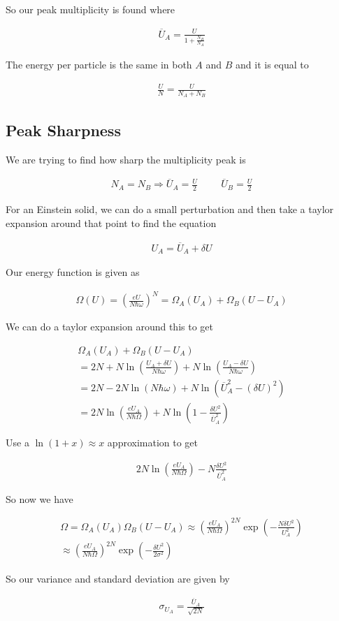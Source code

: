 \documentclass[fleqn]{report}
\newcommand{\hp}{\hspace{1cm}}
\newcommand{\equations} [1] {
\begin{gather*}
#1
\end{gather*}
}
\begin{document}
So our peak multiplicity is found where 

\equations{
    \overline U_A 
    =
    \frac{U}{1 + \frac{N_B}{N_A}}
}

The energy per particle is the same in both $A$ and $B$ and it is equal 
to 
\equations{
    \frac{U}{N}
    =
    \frac{U}{N_A + N_B}
}

\subsection{Peak Sharpness}
We are trying to find how sharp the multiplicity peak is 

\equations{
    N_A 
    =
    N_B 
    \Rightarrow 
    \overline U_A
    =
    \frac{U}{2}
    \hp
    \overline U_B
    =
    \frac{U}{2}
}

For an Einstein solid, we can do a small perturbation and then take a taylor 
expansion around that point to find the equation 

\equations{
    U_A 
    =
    \overline U_A
    +
    \delta U
}

Our energy function is given as 
\equations{
    \Omega(U)
    =
    \left(
        \frac{eU}{N \hbar \omega}
    \right)^N
    =
    \Omega_A(U_A)
    +
    \Omega_B(U - U_A)
}

We can do a taylor expansion around this to get 
\equations{
    \Omega_A(U_A)
    +
    \Omega_B(U - U_A)
    \\
    =
    2N + N \ln(\frac{U_A + \delta U}{N \hbar \omega})
    +
    N \ln(\frac{U_A - \delta U}{N \hbar \omega})
    \\
    =
    2N 
    - 
    2N \ln(N \hbar \omega)
    +
    N \ln(\overline U_A^2 - (\delta U)^2) 
    \\
    =
    2 N \ln(\frac{e U_A}{N \hbar \Omega})
    +
    N \ln(1 - \frac{\delta U^2}{\overline U_A^2})
}

Use a $\ln(1+x) \approx x$ approximation to get 

\equations{
    2 N \ln(\frac{e U_A}{N \hbar \Omega})
    -
    N \frac{\delta U^2}{\overline U_A^2}
}

So now we have 
\equations{
    \Omega 
    =
    \Omega_A(U_A)
    \Omega_B(U - U_A)
    \approx 
    \left(
    \frac{e U_A}{N \hbar \Omega}
    \right)^{2N}
    \exp({- \frac{N \delta U^2}{U_A^2}})
    \\
    \approx 
    \left(
    \frac{e U_A}{N \hbar \Omega}
    \right)^{2N}
    \exp({- \frac{ \delta U^2}{2 \sigma^2}})
}

So our variance and standard deviation are given by 
\equations{
    \sigma_{U_A}
    =
    \frac{\overline U_A}{\sqrt{2N}}
}
\end{document}
